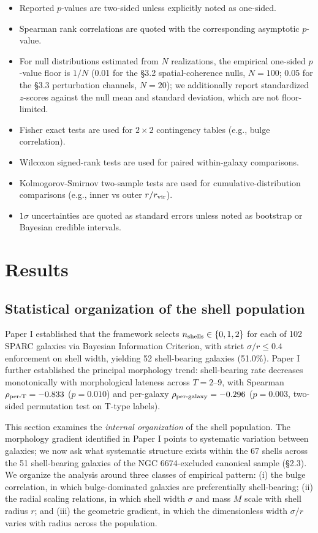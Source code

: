 \documentclass[linenumbers,trackchanges]{aastex701}
\begin{document}
\begin{itemize}
  \item Reported $p$-values are two-sided unless explicitly noted as one-sided.
  \item Spearman rank correlations are quoted with the corresponding asymptotic $p$-value.
  \item For null distributions estimated from $N$ realizations, the empirical one-sided $p$-value floor is $1/N$ (0.01 for the \S3.2 spatial-coherence nulls, $N = 100$; 0.05 for the \S3.3 perturbation channels, $N = 20$); we additionally report standardized $z$-scores against the null mean and standard deviation, which are not floor-limited.
  \item Fisher exact tests are used for $2\times 2$ contingency tables (e.g., bulge correlation).
  \item Wilcoxon signed-rank tests are used for paired within-galaxy comparisons.
  \item Kolmogorov-Smirnov two-sample tests are used for cumulative-distribution comparisons (e.g., inner vs outer $r/r_{\rm vir}$).
  \item $1\sigma$ uncertainties are quoted as standard errors unless noted as bootstrap or Bayesian credible intervals.
\end{itemize}

\section{Results}

\subsection{Statistical organization of the shell population}

Paper I established that the framework selects $n_{\rm shells} \in \{0, 1, 2\}$ for each of 102 SPARC galaxies via Bayesian Information Criterion, with strict $\sigma/r \le 0.4$ enforcement on shell width, yielding 52 shell-bearing galaxies (51.0\%). Paper I further established the principal morphology trend: shell-bearing rate decreases monotonically with morphological lateness across $T = 2$--9, with Spearman $\rho_{\rm per\text{-}T} = -0.833$ ($p = 0.010$) and per-galaxy $\rho_{\rm per\text{-}galaxy} = -0.296$ ($p = 0.003$, two-sided permutation test on T-type labels).

This section examines the \emph{internal organization} of the shell population. The morphology gradient identified in Paper I points to systematic variation between galaxies; we now ask what systematic structure exists within the 67 shells across the 51 shell-bearing galaxies of the NGC 6674-excluded canonical sample (\S2.3). We organize the analysis around three classes of empirical pattern: (i) the bulge correlation, in which bulge-dominated galaxies are preferentially shell-bearing; (ii) the radial scaling relations, in which shell width $\sigma$ and mass $M$ scale with shell radius $r$; and (iii) the geometric gradient, in which the dimensionless width $\sigma/r$ varies with radius across the population.
\end{document}
